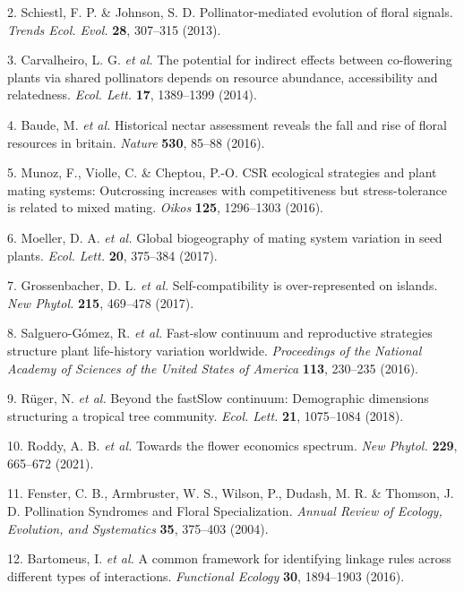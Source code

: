 \documentclass[12pt,a4paper,]{article}
\begin{document}
\hypertarget{ref-schiestl2013}{}
2. Schiestl, F. P. \& Johnson, S. D. Pollinator-mediated evolution of
floral signals. \emph{Trends Ecol. Evol.} \textbf{28}, 307--315 (2013).

\hypertarget{ref-carvalheiro2014}{}
3. Carvalheiro, L. G. \emph{et al.} The potential for indirect effects
between co-flowering plants via shared pollinators depends on resource
abundance, accessibility and relatedness. \emph{Ecol. Lett.}
\textbf{17}, 1389--1399 (2014).

\hypertarget{ref-baude2016}{}
4. Baude, M. \emph{et al.} Historical nectar assessment reveals the fall
and rise of floral resources in britain. \emph{Nature} \textbf{530},
85--88 (2016).

\hypertarget{ref-munoz2016}{}
5. Munoz, F., Violle, C. \& Cheptou, P.-O. CSR ecological strategies and
plant mating systems: Outcrossing increases with competitiveness but
stress-tolerance is related to mixed mating. \emph{Oikos} \textbf{125},
1296--1303 (2016).

\hypertarget{ref-moeller2017}{}
6. Moeller, D. A. \emph{et al.} Global biogeography of mating system
variation in seed plants. \emph{Ecol. Lett.} \textbf{20}, 375--384
(2017).

\hypertarget{ref-grossenbacher2017}{}
7. Grossenbacher, D. L. \emph{et al.} Self-compatibility is
over-represented on islands. \emph{New Phytol.} \textbf{215}, 469--478
(2017).

\hypertarget{ref-salguero2016}{}
8. Salguero-Gómez, R. \emph{et al.} Fast-slow continuum and reproductive
strategies structure plant life-history variation worldwide.
\emph{Proceedings of the National Academy of Sciences of the United
States of America} \textbf{113}, 230--235 (2016).

\hypertarget{ref-ruger2018}{}
9. Rüger, N. \emph{et al.} Beyond the fastSlow continuum: Demographic
dimensions structuring a tropical tree community. \emph{Ecol. Lett.}
\textbf{21}, 1075--1084 (2018).

\hypertarget{ref-roddy2021}{}
10. Roddy, A. B. \emph{et al.} Towards the flower economics spectrum.
\emph{New Phytol.} \textbf{229}, 665--672 (2021).

\hypertarget{ref-fenster2004}{}
11. Fenster, C. B., Armbruster, W. S., Wilson, P., Dudash, M. R. \&
Thomson, J. D. Pollination Syndromes and Floral Specialization.
\emph{Annual Review of Ecology, Evolution, and Systematics} \textbf{35},
375--403 (2004).

\hypertarget{ref-bartomeus2016}{}
12. Bartomeus, I. \emph{et al.} A common framework for identifying
linkage rules across different types of interactions. \emph{Functional
Ecology} \textbf{30}, 1894--1903 (2016).
\end{document}
